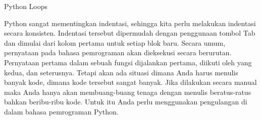 \sloppy
\begin{center}Python Loops\end{center} \par
\vspace{12pt}
\vspace{12pt}
Python sangat mementingkan indentasi, sehingga kita perlu melakukan indentasi secara konsisten.
Indentasi tersebut dipermudah dengan penggunaan tombol Tab dan dimulai dari kolom pertama untuk setiap blok baru\cite{santoso2009bahasa}.
Secara umum, pernyataan pada bahasa pemrograman akan dieksekusi secara berurutan. Pernyataan pertama dalam sebuah fungsi dijalankan pertama, diikuti oleh yang kedua, dan seterusnya. Tetapi akan ada situasi dimana Anda harus menulis banyak kode, dimana kode tersebut sangat banyak. Jika dilakukan secara manual maka Anda hanya akan membuang-buang tenaga dengan menulis beratus-ratus bahkan beribu-ribu kode. Untuk itu Anda perlu menggunakan pengulangan di dalam bahasa pemrograman Python. \par

